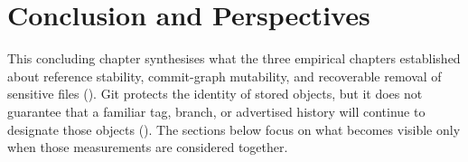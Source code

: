 %
%
\chapter{Conclusion and Perspectives}
\label{chap:conclusion}

This concluding chapter synthesises what the three empirical chapters established about reference stability, commit-graph mutability, and recoverable removal of sensitive files ().
Git protects the identity of stored objects, but it does not guarantee that a familiar tag, branch, or advertised history will continue to designate those objects ().
The sections below focus on what becomes visible only when those measurements are considered together.






